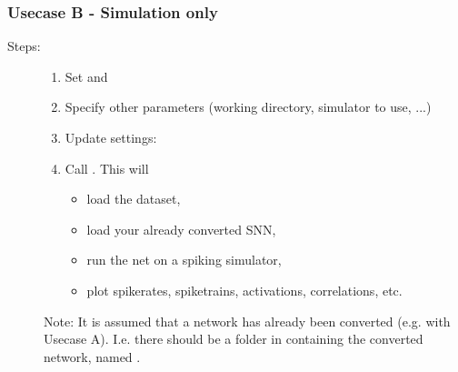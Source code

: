 \documentclass[letterpaper,10pt,english]{sphinxmanual}
\begin{document}
\subsubsection{Usecase B - Simulation only}
\label{getting_started:evaluated}\label{getting_started:usecase-b-simulation-only}\label{getting_started:simulation-only}\begin{description}
\item[{Steps:}] \leavevmode\begin{enumerate}
\item {} 
Set  and 

\item {} 
Specify other parameters (working directory, simulator to use, ...)

\item {} 
Update settings: 

\item {} 
Call . This will
\begin{itemize}
\item {} 
load the dataset,

\item {} 
load your already converted SNN,

\item {} 
run the net on a spiking simulator,

\item {} 
plot spikerates, spiketrains, activations, correlations, etc.

\end{itemize}

\end{enumerate}

Note: It is assumed that a network has already been converted (e.g. with
Usecase A). I.e. there should be a folder in  containing the
converted network, named .

\end{description}
\end{document}
